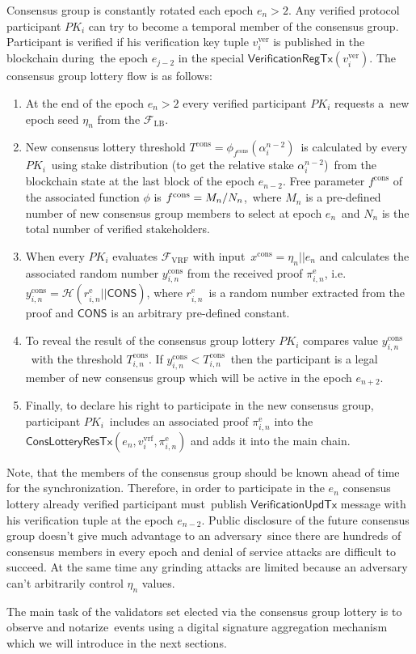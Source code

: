 Consensus group is constantly rotated each epoch ${e_n \gt 2}$.
Any verified protocol participant $PK_i$ can try to become a temporal member of the consensus group.
Participant is verified if his verification key tuple $v_i^{\text{ver}}$ is published in the blockchain during\
the epoch $e_{j-2}$ in the special $\textsf{VerificationRegTx}(v_i^{\text{ver}})$.
The consensus group lottery flow is as follows:
\begin{enumerate}
    \item At the end of the epoch ${e_n \gt 2}$ every verified participant $PK_i$ requests a\
    new epoch seed $\eta_n$ from the ${\mathcal{F}}_{\text{LB}}$.
    \item New consensus lottery threshold $T^{\text{cons}} = \phi_{f^{\text{cons}}}(\alpha^{n-2}_i)$\
    is calculated by every $PK_i$\ using stake distribution (to get the relative stake $\alpha^{n - 2}_{i}$)\
    from the blockchain state at the last block of the epoch $e_{n - 2}$.
    Free parameter $f^{\text{cons}}$ of the associated function $\phi$ is ${f^{\text{cons}} = M_n /\/ N_n}$,\
    where $M_n$ is a pre-defined number of new consensus group members to select at epoch $e_n$\
    and $N_n$ is the total number of verified stakeholders.
    \item When every $PK_i$ evaluates ${\mathcal{F}}_{\text{VRF}}$ with input\
    $x^{\text{cons}} = \eta_n || e_n $ and calculates the associated random number $y_{i, n}^{\text{cons}}$ from the received proof $\pi_{i, n}^{\text{e}}$, i.e.\
    ${y_{i, n}^{\text{cons}} = \mathcal{H}(r_{i, n}^{\text{e}}||\textsf{CONS})}$, where $r_{i, n}^{\text{e}}$\
    is a random number extracted from the proof and $\textsf{CONS}$ is an arbitrary pre-defined constant.
    \item To reveal the result of the consensus group lottery $PK_i$ compares value $y_{i, n}^{\text{cons}}$\
    with the threshold $T_{i, n}^{\text{cons}}$.
    If ${y_{i, n}^{\text{cons}} < T_{i, n}^{\text{cons}}}$\
    then the participant is a legal member of new consensus group which will be active in the epoch $e_{n+2}$.
    \item Finally, to declare his right to participate in the new consensus group, participant $PK_i$\
    includes an associated proof $\pi_{i, n}^{\text{e}}$ into the\
    $\textsf{ConsLotteryResTx}(e_n, v_i^{\text{vrf}}, \pi_{i, n}^{\text{e}})$ and adds it into the main chain.
\end{enumerate}
Note, that the members of the consensus group should be known ahead of time for the synchronization.
Therefore, in order to participate in the $e_n$ consensus lottery already verified participant must\
publish $\textsf{VerificationUpdTx}$ message with his verification tuple at the epoch $e_{n-2}$.
Public disclosure of the future consensus group doesn't give much advantage to an adversary\
since there are hundreds of consensus members in every epoch and denial of service attacks are difficult to succeed.
At the same time any grinding attacks are limited because an adversary can't arbitrarily control $\eta_n$ values.

The main task of the validators set elected via the consensus group lottery is to observe and notarize\
events using a digital signature aggregation mechanism which we will introduce in the next sections.